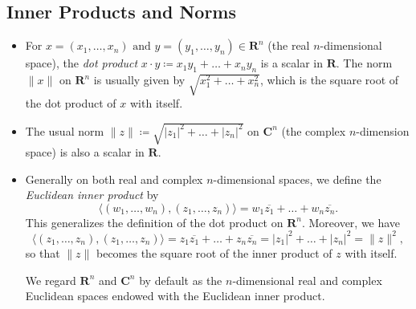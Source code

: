 \documentclass[11pt]{article}
\newcommand{\df}[1]{\textit{\textsf{#1}}}
\newcommand{\R}{\mathbf{R}}
\newcommand{\C}{\mathbf{C}}
\newcommand{\conj}[1]{\overline{#1}}
\newcommand{\inp}[2]{\langle #1, #2 \rangle}
\newcommand{\abs}[1]{\lvert #1 \rvert}
\begin{document}
\subsection{Inner Products and Norms}
\begin{itemize}
    \item For $x=(x_1,\dots,x_n) \text{ and } y=(y_1,\dots,y_n) \in \R^n$ (the real $n$-dimensional space), the \df{dot product} $x \cdot y \coloneqq x_1y_1+\dots+x_ny_n$ is a scalar in $\R$. The norm $\|x\|$ on $\R^n$ is usually given by $\sqrt{x_1^2+\dots+x_n^2}$, which is the square root of the dot product of $x$ with itself.
    \item The usual norm $\|z\| \coloneqq  \sqrt{\abs{z_1}^2+\dots+\abs{z_n}^2}$ on $\C^n$ (the complex $n$-dimension space) is also a scalar in $\R$.
    \item Generally on both real and complex $n$-dimensional spaces, we define the \df{Euclidean inner product} by $$\inp{(w_1,\dots,w_n)}{(z_1,\dots,z_n)} =  w_1\conj{z_1}+\dots+w_n\conj{z_n}.$$ This generalizes the definition of the dot product on $\R^n$. Moreover, we have $$\inp{(z_1,\dots,z_n)}{(z_1,\dots,z_n)} = z_1\conj{z_1}+\dots+z_n\conj{z_n} = \abs{z_1}^2 + \dots + \abs{z_n}^2 = \|z\|^2,$$ so that $\|z\|$ becomes the square root of the inner product of $z$ with itself.
    
    We regard $\R^n$ and $\C^n$ by default as the $n$-dimensional real and complex Euclidean spaces endowed with the Euclidean inner product. 
    

\end{itemize}
\end{document}
